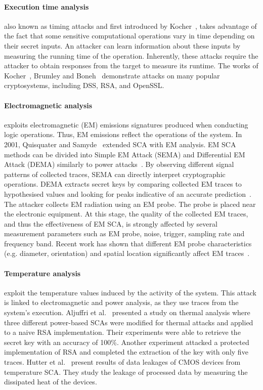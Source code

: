 \paragraph{Execution time analysis} also known as timing attacks and first introduced by Kocher~\cite{K-96-crypto}, takes advantage of the fact that some sensitive computational operations vary in time depending on their secret inputs. An attacker can learn information about these inputs by measuring the running time of the operation. Inherently, these attacks require the attacker to obtain responses from the target to measure its runtime. The works of Kocher~\cite{K-96-crypto}, Brumley and Boneh~\cite{DD-05-compnet} demonstrate attacks on many popular cryptosystems, including DSS, RSA, and OpenSSL.

\paragraph{Electromagnetic analysis} exploits electromagnetic (EM) emissions signatures produced when conducting logic operations. Thus, EM emissions reflect the operations of the system. In 2001, Quisquater and Samyde~\cite{QS-01-scps} extended SCA with EM analysis.
EM SCA methods can be divided into Simple EM Attack (SEMA) and Differential EM Attack (DEMA) similarly to power attacks~\cite{ANM-19-di}. By observing different signal patterns of collected traces, SEMA can directly interpret cryptographic operations. DEMA extracts secret keys by comparing collected EM traces to hypothesised values and looking for peaks indicative of an accurate prediction~\cite{HGTVJ-22-dt}.
The attacker collects EM radiation using an EM probe. The probe is placed near the electronic equipment. At this stage, the quality of the collected EM traces, and thus the effectiveness of EM SCA, is strongly affected by several measurement parameters such as EM probe, noise, trigger, sampling rate and frequency band. Recent work has shown that different EM probe characteristics (e.g. diameter, orientation) and spatial location significantly affect EM traces~\cite{HMHSS-12-tcrypo,KSTO-17-iccad, WDL-16-ntms}.

\paragraph{Temperature analysis} exploit the temperature values induced by the activity of the system. This attack is linked to electromagnetic and power analysis, as they use traces from the system's execution. Aljuffri et al.~\cite{AZRHT-21-tvlsi} presented a study on thermal analysis where three different power-based SCAs were modified for thermal attacks and applied to a naive RSA implementation. Their experiments were able to retrieve the secret key with an accuracy of 100\%. Another experiment attacked a protected implementation of RSA and completed the extraction of the key with only five traces. Hutter et al.~\cite{HS-14-cardis} present results of data leakages of CMOS devices from temperature SCA. They study the leakage of processed data by measuring the dissipated heat of the devices.

